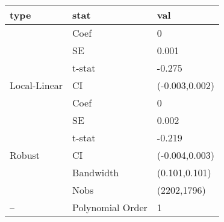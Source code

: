 
\begin{tabular}{lll}
\toprule
type & stat & val\\
\midrule
 & Coef & 0\\

 & SE & 0.001\\

 & t-stat & -0.275\\

\multirow{-4}{*}{\raggedright\arraybackslash Local-Linear} & CI & (-0.003,0.002)\\
\cmidrule{1-3}
 & Coef & 0\\

 & SE & 0.002\\

 & t-stat & -0.219\\

\multirow{-4}{*}{\raggedright\arraybackslash Robust} & CI & (-0.004,0.003)\\
\cmidrule{1-3}
 & Bandwidth & (0.101,0.101)\\

 & Nobs & (2202,1796)\\

\multirow{-3}{*}{\raggedright\arraybackslash --} & Polynomial Order & 1\\
\bottomrule
\end{tabular}